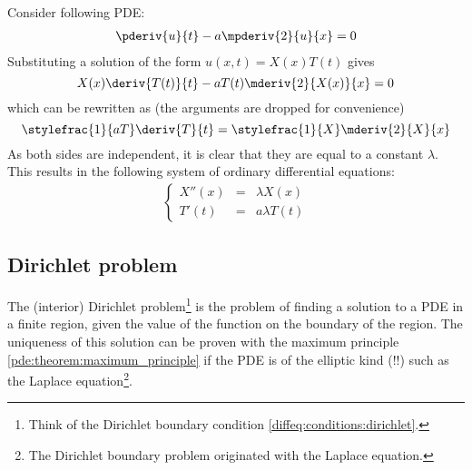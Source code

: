 	\begin{example}
		Consider following PDE:
        	\begin{gather}
			\pderiv{u}{t} - a\mpderiv{2}{u}{x} = 0
		\end{gather}
		Substituting a solution of the form $u(x, t) = X(x)T(t)$ gives \[X(x)\deriv{T(t)}{t} - aT(t)\mderiv{2}{X(x)}{x} = 0\] which can be rewritten as (the arguments are dropped for convenience) \[        	\stylefrac{1}{aT}\deriv{T}{t} = \stylefrac{1}{X}\mderiv{2}{X}{x}\] As both sides are independent, it is clear that they are equal to a constant $\lambda$. This results in the following system of ordinary differential equations:
		\begin{gather}
	        	\left\{
			\begin{array}{ccc}
				X''(x) &=& \lambda X(x)\\
				T'(t) &=& a\lambda T(t)
			\end{array}
			\right.
		\end{gather}
	\end{example}

\subsection{Dirichlet problem}

	The (interior) Dirichlet problem\footnote{Think of the Dirichlet boundary condition \ref{diffeq:conditions:dirichlet}.} is the problem of finding a solution to a PDE in a finite region, given the value of the function on the boundary of the region. The uniqueness of this solution can be proven with the maximum principle \ref{pde:theorem:maximum_principle} if the PDE is of the elliptic kind (!!) such as the Laplace equation\footnote{The Dirichlet boundary problem originated with the Laplace equation.}.

    

